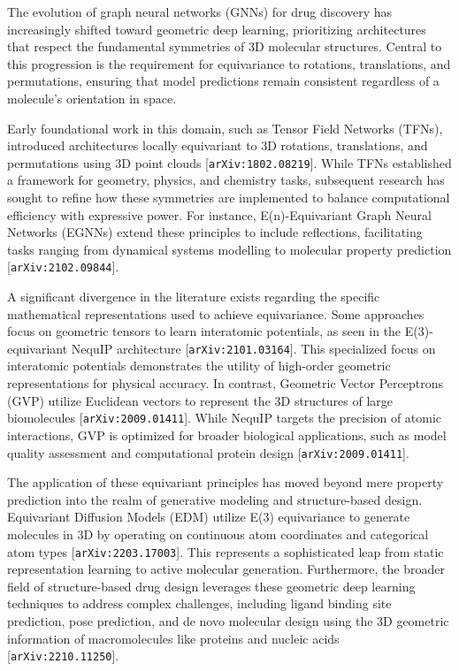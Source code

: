 \documentclass[11pt]{article}
\begin{document}
The evolution of graph neural networks (GNNs) for drug discovery has increasingly shifted toward geometric deep learning, prioritizing architectures that respect the fundamental symmetries of 3D molecular structures. Central to this progression is the requirement for equivariance to rotations, translations, and permutations, ensuring that model predictions remain consistent regardless of a molecule's orientation in space.

Early foundational work in this domain, such as Tensor Field Networks (TFNs), introduced architectures locally equivariant to 3D rotations, translations, and permutations using 3D point clouds [\texttt{arXiv:1802.08219}]. While TFNs established a framework for geometry, physics, and chemistry tasks, subsequent research has sought to refine how these symmetries are implemented to balance computational efficiency with expressive power. For instance, E(n)-Equivariant Graph Neural Networks (EGNNs) extend these principles to include reflections, facilitating tasks ranging from dynamical systems modelling to molecular property prediction [\texttt{arXiv:2102.09844}].

A significant divergence in the literature exists regarding the specific mathematical representations used to achieve equivariance. Some approaches focus on geometric tensors to learn interatomic potentials, as seen in the E(3)-equivariant NequIP architecture [\texttt{arXiv:2101.03164}]. This specialized focus on interatomic potentials demonstrates the utility of high-order geometric representations for physical accuracy. In contrast, Geometric Vector Perceptrons (GVP) utilize Euclidean vectors to represent the 3D structures of large biomolecules [\texttt{arXiv:2009.01411}]. While NequIP targets the precision of atomic interactions, GVP is optimized for broader biological applications, such as model quality assessment and computational protein design [\texttt{arXiv:2009.01411}].

The application of these equivariant principles has moved beyond mere property prediction into the realm of generative modeling and structure-based design. Equivariant Diffusion Models (EDM) utilize E(3) equivariance to generate molecules in 3D by operating on continuous atom coordinates and categorical atom types [\texttt{arXiv:2203.17003}]. This represents a sophisticated leap from static representation learning to active molecular generation. Furthermore, the broader field of structure-based drug design leverages these geometric deep learning techniques to address complex challenges, including ligand binding site prediction, pose prediction, and de novo molecular design using the 3D geometric information of macromolecules like proteins and nucleic acids [\texttt{arXiv:2210.11250}].
\end{document}

